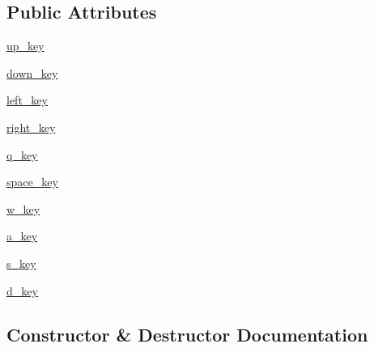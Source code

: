 \subsection*{Public Attributes}
\begin{DoxyCompactItemize}
\item 
\hyperlink{classbridges_1_1input__helper_1_1_input_helper_ab73e09b11d389d7dd63f0772eba7f39e}{up\+\_\+key}
\item 
\hyperlink{classbridges_1_1input__helper_1_1_input_helper_aa04e96346543b8cdf8352440b021ba53}{down\+\_\+key}
\item 
\hyperlink{classbridges_1_1input__helper_1_1_input_helper_a15b6199dc0dfd7354557a19e07755f5a}{left\+\_\+key}
\item 
\hyperlink{classbridges_1_1input__helper_1_1_input_helper_a1d34896a89ac06f8ab93915e668f4f75}{right\+\_\+key}
\item 
\hyperlink{classbridges_1_1input__helper_1_1_input_helper_ad50670b8a6479a116dd9f1468e2b6a66}{q\+\_\+key}
\item 
\hyperlink{classbridges_1_1input__helper_1_1_input_helper_a7500af436b4d85fc13fb351d661cf0d9}{space\+\_\+key}
\item 
\hyperlink{classbridges_1_1input__helper_1_1_input_helper_a5805e22dfd0bda43e27aacb3bc638df3}{w\+\_\+key}
\item 
\hyperlink{classbridges_1_1input__helper_1_1_input_helper_acb7d988d14de58f5fff87ad91bef430f}{a\+\_\+key}
\item 
\hyperlink{classbridges_1_1input__helper_1_1_input_helper_a88978da995aaea7c6267a72cbd4d11c9}{s\+\_\+key}
\item 
\hyperlink{classbridges_1_1input__helper_1_1_input_helper_a04f38a8c929984bdc0c6f4c98927c8dd}{d\+\_\+key}
\end{DoxyCompactItemize}


\subsection{Constructor \& Destructor Documentation}
\mbox{\label{classbridges_1_1input__helper_1_1_input_helper_a1e5078f3c252de554409d3fdb49fcaaa}} 
